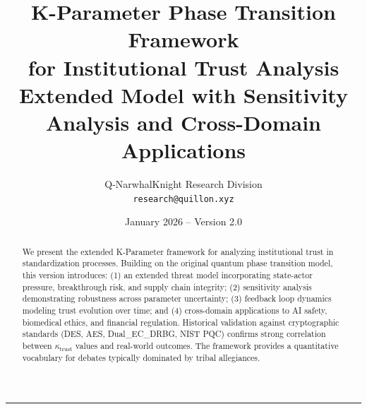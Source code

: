 \documentclass[11pt]{article}
\title{\LARGE\bfseries K-Parameter Phase Transition Framework\\for Institutional Trust Analysis\vspace{0.5em}\\
\large Extended Model with Sensitivity Analysis and Cross-Domain Applications}
\author{Q-NarwhalKnight Research Division\\
\texttt{research@quillon.xyz}}
\date{January 2026 -- Version 2.0}
\begin{document}
\maketitle

\begin{abstract}
\noindent We present the extended K-Parameter framework for analyzing institutional trust in standardization processes. Building on the original quantum phase transition model, this version introduces: (1) an extended threat model incorporating state-actor pressure, breakthrough risk, and supply chain integrity; (2) sensitivity analysis demonstrating robustness across parameter uncertainty; (3) feedback loop dynamics modeling trust evolution over time; and (4) cross-domain applications to AI safety, biomedical ethics, and financial regulation. Historical validation against cryptographic standards (DES, AES, Dual\_EC\_DRBG, NIST PQC) confirms strong correlation between $\kappa_{\text{trust}}$ values and real-world outcomes. The framework provides a quantitative vocabulary for debates typically dominated by tribal allegiances.
\end{abstract}

\vspace{0.5em}
\hrule
\vspace{1em}
\end{document}
